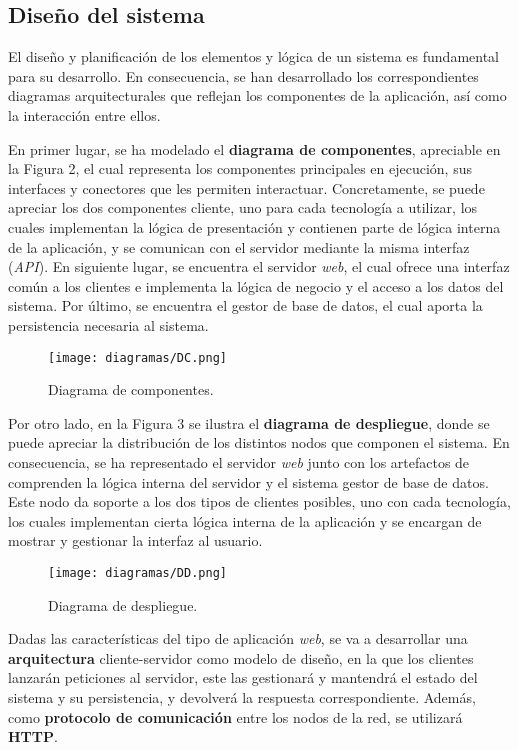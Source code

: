 \documentclass[11pt, a4paper, titlepage]{article}
\begin{document}
\newpage

\subsection{Diseño del sistema}

El diseño y planificación de los elementos y lógica de un sistema es fundamental para su desarrollo. En consecuencia, se han desarrollado los correspondientes diagramas arquitecturales que reflejan los componentes de la aplicación, así como la interacción entre ellos. \newline

En primer lugar, se ha modelado el \textbf{diagrama de componentes}, apreciable en la Figura 2, el cual representa los componentes principales en ejecución, sus interfaces y conectores que les permiten interactuar. Concretamente, se puede apreciar los dos componentes cliente, uno para cada tecnología a utilizar, los cuales implementan la lógica de presentación y contienen parte de lógica interna de la aplicación, y se comunican con el servidor mediante la misma interfaz (\textit{API}). En siguiente lugar, se encuentra el servidor \textit{web}, el cual ofrece una interfaz común a los clientes e implementa la lógica de negocio y el acceso a los datos del sistema. Por último, se encuentra el gestor de base de datos, el cual aporta la persistencia necesaria al sistema.

\begin{figure}[h!]
    \centering
    \texttt{[image: diagramas/DC.png]}
    \caption{Diagrama de componentes.}
\end{figure}


Por otro lado, en la Figura 3 se ilustra el \textbf{diagrama de despliegue}, donde se puede apreciar la distribución de los distintos nodos que componen el sistema. En consecuencia, se ha representado el servidor \textit{web} junto con los artefactos de comprenden la lógica interna del servidor y el sistema gestor de base de datos. Este nodo da soporte a los dos tipos de clientes posibles, uno con cada tecnología, los cuales implementan cierta lógica interna de la aplicación y se encargan de mostrar y gestionar la interfaz al usuario. 

\begin{figure}[h!]
    \centering
    \texttt{[image: diagramas/DD.png]}
    \caption{Diagrama de despliegue.}
\end{figure}

Dadas las características del tipo de aplicación \textit{web}, se va a desarrollar una \textbf{arquitectura} cliente-servidor como modelo de diseño, en la que los clientes lanzarán peticiones al servidor, este las gestionará y mantendrá el estado del sistema y su persistencia, y devolverá la respuesta correspondiente. Además, como \textbf{protocolo de comunicación} entre los nodos de la red, se utilizará \textbf{HTTP}.
\end{document}
